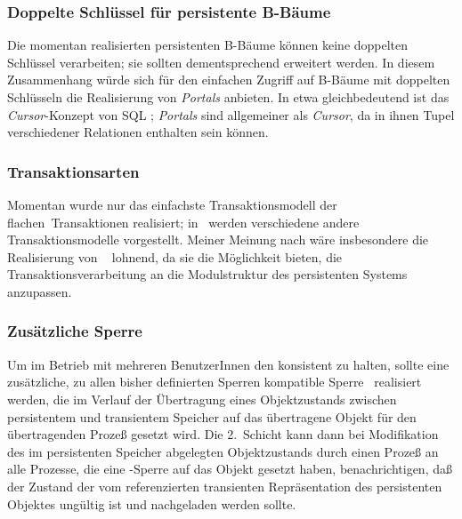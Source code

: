 \subsubsection{Doppelte Schl\"{u}ssel f\"{u}r persistente B-B\"{a}ume}%
%
Die momentan realisierten persistenten B-B\"{a}ume k\"{o}nnen keine
doppelten Schl\"{u}ssel verarbeiten; sie sollten dementsprechend
erweitert werden. In diesem Zusammenhang w\"{u}rde sich f\"{u}r den
einfachen Zugriff auf B-B\"{a}ume mit doppelten Schl\"{u}sseln die
Realisierung von {\em Portals\/} \cite[]{bib:we93}
anbieten. In etwa gleichbedeutend ist das {\em Cursor\/}-Konzept von
SQL \cite[]{bib:on94}; {\em Portals\/} sind allgemeiner
als {\em Cursor}, da in ihnen Tupel verschiedener Relationen enthalten
sein k\"{o}nnen.
%
\subsubsection{Transaktionsarten}%
%
Momentan wurde nur das einfachste Transaktionsmodell der
\rglq{}flachen\rgrq\ Transaktionen realisiert; in
\cite[]{bib:gr93}\ werden verschiedene andere
Transaktionsmodelle vorgestellt. Meiner Meinung nach w\"{a}re
insbesondere die Realisierung von \ \cite[]{bib:gr93}
lohnend, da sie die M\"{o}glichkeit bieten, die Transaktionsverarbeitung
an die Modulstruktur des persistenten Systems anzupassen.
%
%
\subsubsection{Zus\"{a}tzliche Sperre}
%
Um im Betrieb mit mehreren BenutzerInnen den \cache\/ konsistent zu
halten, sollte eine zu\-s\"{a}tz\-li\-che, zu allen bisher definierten
Sperren kompatible Sperre \rgrq\ realisiert
werden, die im Verlauf der \"{U}bertragung eines Objektzustands zwischen
persistentem und transientem Speicher auf das \"{u}bertragene Objekt f\"{u}r
den \"{u}bertragenden Proze\ss{} gesetzt wird. Die 2.\ Schicht kann dann bei
Modifikation des im persistenten Speicher abgelegten Objektzustands
durch einen Proze\ss{} an alle Prozesse, die eine \rgrq-Sperre auf das Objekt gesetzt haben,
benachrichtigen, da\ss{} der Zustand der vom \cache\/ referenzierten
transienten Repr\"{a}sentation des persistenten Objektes ung\"{u}ltig ist
und nachgeladen werden sollte.
%
%
%
